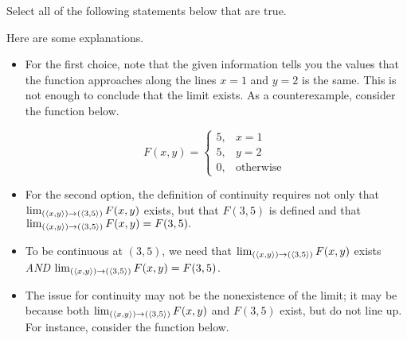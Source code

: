 \documentclass{ximera}
\author{Jim Talamo}
\begin{document}
\begin{exercise}

Select all of the following statements below that are true.

\begin{selectAll}
\end{selectAll}

\begin{feedback}[correct] 

Here are some explanations.
\begin{itemize}

\item For the first choice, note that the given information tells you the values that the function approaches along the lines $x=1$ and $y=2$ is the same.  This is not enough to conclude that the limit exists.  As a counterexample, consider the function below.

\[
F(x,y) = \begin{cases} 5, & x=1 \\ 5, & y=2 \\ 0, & \textrm{otherwise } \end{cases}
\]

\item For the second option, the definition of continuity requires not only that  $\lim_{\left(\left\langle x,y\right\rangle\right) \to \left(\left\langle 3,5\right\rangle\right)} F(x,y)$ exists, but that $F(3,5)$ is defined and that $\lim_{\left(\left\langle x,y\right\rangle\right) \to \left(\left\langle 3,5\right\rangle\right)} F(x,y)=F(3,5).$ 

\item To be continuous at $(3,5)$, we need that $\lim_{\left(\left\langle x,y\right\rangle\right) \to \left(\left\langle 3,5\right\rangle\right)} F(x,y)$ exists \emph{AND} $\lim_{\left(\left\langle x,y\right\rangle\right) \to \left(\left\langle 3,5\right\rangle\right)} F(x,y) = F(3,5)$.

\item The issue for continuity may not be the nonexistence of the limit; it may be because both $\lim_{\left(\left\langle x,y\right\rangle\right) \to \left(\left\langle 3,5\right\rangle\right)} F(x,y)$ and $F(3,5)$ exist, but do not line up.  For instance, consider the function below.


\end{itemize}
\end{feedback}
\end{exercise}
\end{document}
